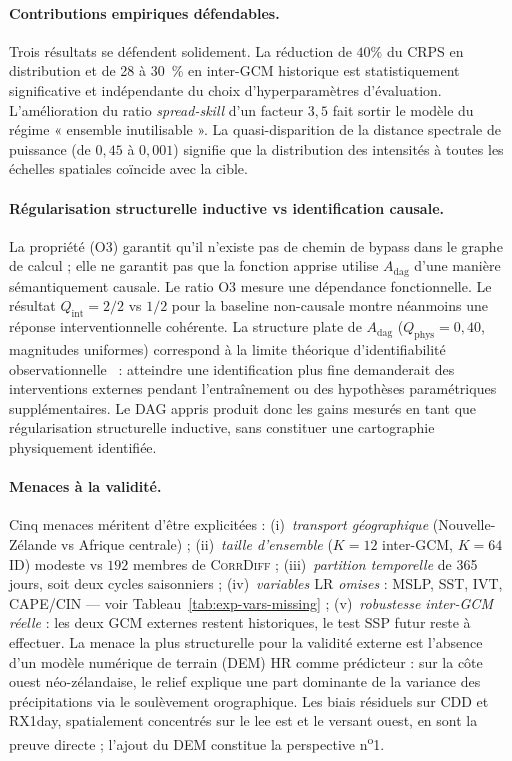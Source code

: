 \documentclass[14pt,a4paper,openany]{extreport}
\theoremstyle{definition}
\newcommand{\CorrDiff}{\textsc{CorrDiff}}
\newcommand{\LR}{\ensuremath{\text{LR}}}
\newcommand{\Adag}{\ensuremath{A_{\mathrm{dag}}}}
\begin{document}
\paragraph{Contributions empiriques défendables.} Trois résultats se défendent solidement. La réduction de $40\%$ du CRPS en distribution et de 28 à 30~\% en inter-GCM historique est statistiquement significative et indépendante du choix d'hyperparamètres d'évaluation. L'amélioration du ratio \emph{spread-skill} d'un facteur $3{,}5$ fait sortir le modèle du régime « ensemble inutilisable ». La quasi-disparition de la distance spectrale de puissance (de $0{,}45$ à $0{,}001$) signifie que la distribution des intensités à toutes les échelles spatiales coïncide avec la cible.

\paragraph{Régularisation structurelle inductive vs identification causale.} La propriété (O3) garantit qu'il n'existe pas de chemin de bypass dans le graphe de calcul ; elle ne garantit pas que la fonction apprise utilise $\Adag$ d'une manière sémantiquement causale. Le ratio O3 mesure une dépendance fonctionnelle. Le résultat $Q_{\mathrm{int}} = 2/2$ vs $1/2$ pour la baseline non-causale montre néanmoins une réponse interventionnelle cohérente. La structure plate de $\Adag$ ($Q_{\mathrm{phys}}=0{,}40$, magnitudes uniformes) correspond à la limite théorique d'identifiabilité observationnelle~\cite{pearl_causality_2009,spirtes_2000} : atteindre une identification plus fine demanderait des interventions externes pendant l'entraînement ou des hypothèses paramétriques supplémentaires. Le DAG appris produit donc les gains mesurés en tant que régularisation structurelle inductive, sans constituer une cartographie physiquement identifiée.

\paragraph{Menaces à la validité.} Cinq menaces méritent d'être explicitées : (i)~\emph{transport géographique} (Nouvelle-Zélande vs Afrique centrale) ; (ii)~\emph{taille d'ensemble} ($K=12$ inter-GCM, $K=64$ ID) modeste vs $192$ membres de \CorrDiff{} ; (iii)~\emph{partition temporelle} de 365 jours, soit deux cycles saisonniers ; (iv)~\emph{variables \LR{} omises} : MSLP, SST, IVT, CAPE/CIN --- voir Tableau~\ref{tab:exp-vars-missing} ; (v)~\emph{robustesse inter-GCM réelle} : les deux GCM externes restent historiques, le test SSP futur reste à effectuer. La menace la plus structurelle pour la validité externe est l'absence d'un modèle numérique de terrain (DEM) HR comme prédicteur : sur la côte ouest néo-zélandaise, le relief explique une part dominante de la variance des précipitations via le soulèvement orographique. Les biais résiduels sur CDD et RX1day, spatialement concentrés sur le lee est et le versant ouest, en sont la preuve directe ; l'ajout du DEM constitue la perspective n\textsuperscript{o}1.
\end{document}

